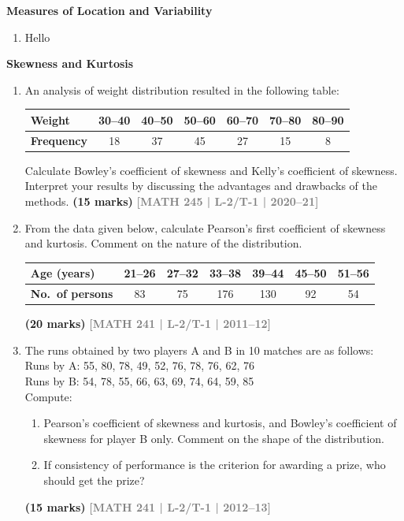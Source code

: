\documentclass[12pt,a4paper]{article}
\newcommand{\yr}[1]{\hfill\textcolor{gray}{\small\textbf{[#1]}}}
\newcommand{\mk}[1]{\textcolor{orange!70!black}{\small\textbf{(#1 marks)}}}
\newcommand{\subtopic}[2]{%
  \vspace{10pt}
  \noindent\begin{tcolorbox}[colback=#1!8,colframe=#1,boxrule=0.6pt,arc=4pt,
    left=6pt,right=6pt,top=4pt,bottom=4pt]
    \small\bfseries\textcolor{#1}{#2}
  \end{tcolorbox}
  \vspace{2pt}
}
\begin{document}
\subtopic{cG}{Measures of Location and Variability}
\label{sub:s7-measures}

\begin{enumerate}
\item Hello \end{enumerate}

\subtopic{cG}{Skewness and Kurtosis}
\label{sub:s7-moments}

\begin{enumerate}

\item An analysis of weight distribution resulted in the following table:
\begin{center}
\begin{tabular}{lcccccc}
\toprule
\textbf{Weight}    & 30--40 & 40--50 & 50--60 & 60--70 & 70--80 & 80--90 \\
\midrule
\textbf{Frequency} & 18 & 37 & 45 & 27 & 15 & 8 \\
\bottomrule
\end{tabular}
\end{center}
Calculate Bowley's coefficient of skewness and Kelly's coefficient of skewness. Interpret your results by discussing the advantages and drawbacks of the methods.
\mk{15} \yr{MATH 245 | L-2/T-1 | 2020--21}

\item From the data given below, calculate Pearson's first coefficient of skewness and kurtosis. Comment on the nature of the distribution.
\begin{center}
\begin{tabular}{lcccccc}
\toprule
\textbf{Age (years)} & 21--26 & 27--32 & 33--38 & 39--44 & 45--50 & 51--56 \\
\midrule
\textbf{No.\ of persons} & 83 & 75 & 176 & 130 & 92 & 54 \\
\bottomrule
\end{tabular}
\end{center}
\mk{20} \yr{MATH 241 | L-2/T-1 | 2011--12}

\item The runs obtained by two players A and B in 10 matches are as follows:\\[4pt]
Runs by A: 55, 80, 78, 49, 52, 76, 78, 76, 62, 76\\
Runs by B: 54, 78, 55, 66, 63, 69, 74, 64, 59, 85\\[4pt]
Compute:
\begin{enumerate}
  \item Pearson's coefficient of skewness and kurtosis, and Bowley's coefficient of skewness for player B only. Comment on the shape of the distribution.
  \item If consistency of performance is the criterion for awarding a prize, who should get the prize?
\end{enumerate}
\mk{15} \yr{MATH 241 | L-2/T-1 | 2012--13}


\end{enumerate}
\end{document}
